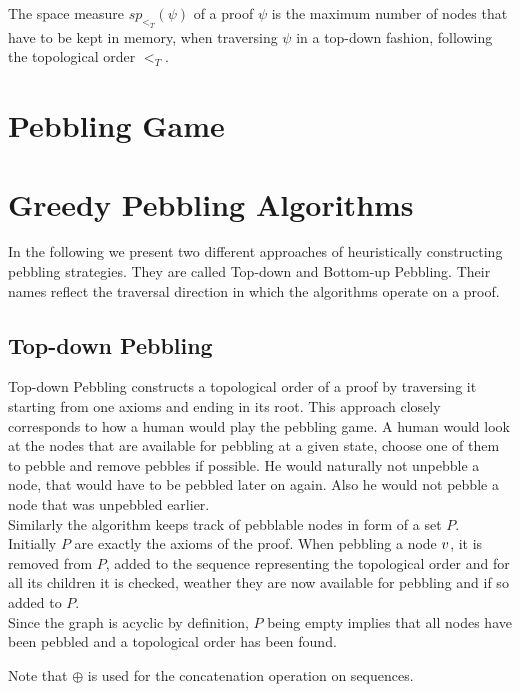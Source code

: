 \documentclass{llncs}
\begin{document}
\begin{definition}
\label{def:space measure}
The space measure $sp_{<_T}(\psi)$ of a proof $\psi$ is the maximum number of nodes that have to be kept in memory, when traversing $\psi$ in a top-down fashion, following the topological order $<_T$.
\end{definition}

\section{Pebbling Game}

\section{Greedy Pebbling Algorithms}

In the following we present two different approaches of heuristically constructing pebbling strategies.
They are called Top-down and Bottom-up Pebbling. Their names reflect the traversal direction in which the algorithms operate on a proof.

\subsection{Top-down Pebbling}

Top-down Pebbling constructs a topological order of a proof by traversing it starting from one axioms and ending in its root.
This approach closely corresponds to how a human would play the pebbling game. 
A human would look at the nodes that are available for pebbling at a given state, choose one of them to pebble and remove pebbles if possible.
He would naturally not unpebble a node, that would have to be pebbled later on again. Also he would not pebble a node that was unpebbled earlier.\\
Similarly the algorithm keeps track of pebblable nodes in form of a set $P$. Initially $P$ are exactly the axioms of the proof. 
When pebbling a node $v$, it is removed from $P$, added to the sequence representing the topological order and for all its children it is checked, weather they are now available for pebbling and if so added to $P$.\\
Since the graph is acyclic by definition, $P$ being empty implies that all nodes have been pebbled and a topological order has been found.

Note that $\oplus$ is used for the concatenation operation on sequences. %
\end{document}
